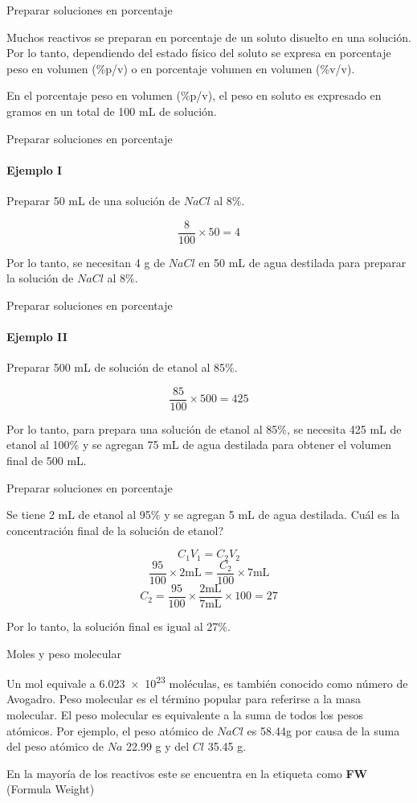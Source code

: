 \documentclass[12pt, aspectratio=169]{beamer}
\begin{document}
\begin{frame}{Preparar soluciones en porcentaje}
	
	Muchos reactivos se preparan en porcentaje de un soluto disuelto en una soluci\'on. Por lo tanto, dependiendo del estado f\'isico del soluto se expresa en porcentaje peso en volumen (\%p/v) o en porcentaje volumen en volumen (\%v/v).
	
	En el porcentaje peso en volumen (\%p/v), el peso en soluto es expresado en gramos en un total de 100 mL de soluci\'on.

\end{frame}

\begin{frame}{Preparar soluciones en porcentaje}
	\framesubtitle{Ejemplo I}
	Preparar 50 mL de una soluci\'on de $NaCl$ al 8\%.
	
	$$\frac{8}{100} \times 50 = 4$$
	
	Por lo tanto, se necesitan 4 g de $NaCl$ en 50 mL de agua destilada para preparar la soluci\'on de $NaCl$ al 8\%.
	
\end{frame}

\begin{frame}{Preparar soluciones en porcentaje}
	\framesubtitle{Ejemplo II}
	Preparar 500 mL de soluci\'on de etanol al 85\%.
	
	$$\frac{85}{100} \times 500 = 425$$
	
	Por lo tanto, para prepara una soluci\'on de etanol al 85\%, se necesita 425 mL de etanol al 100\% y se agregan 75 mL de agua destilada para obtener el volumen final de 500 mL. 
	
\end{frame}

\begin{frame}{Preparar soluciones en porcentaje}
		
	Se tiene 2 mL de etanol al 95\% y se agregan 5 mL de agua destilada. \textquestiondown Cu\'al es la concentraci\'on final de la soluci\'on de etanol?
	
	$$C_1V_1 = C_2V_2$$
	$$\frac{95}{100} \times 2 \text{mL} = \frac{C_2}{100} \times 7 \text{mL}$$
	$$C_2 = \frac{95}{100} \times \frac{2 \text{mL}}{ 7 \text{mL}} \times 100 = 27$$
	
	Por lo tanto, la soluci\'on final es igual al 27\%.
	
\end{frame}

\begin{frame}{Moles y peso molecular}

	Un mol equivale a \num{6.023e23} mol\'eculas, es tambi\'en conocido como n\'umero de Avogadro. Peso molecular es el t\'ermino popular para referirse a la masa molecular. El peso molecular es equivalente a la suma de todos los pesos at\'omicos. Por ejemplo, el peso at\'omico de $NaCl$ es 58.44g por causa de la suma del peso at\'omico de $Na$ 22.99 g y del $Cl$ 35.45 g. 
	
	En la mayor\'ia de los reactivos este se encuentra en la etiqueta como \textbf{FW} (Formula Weight)

\end{frame}
\end{document}
